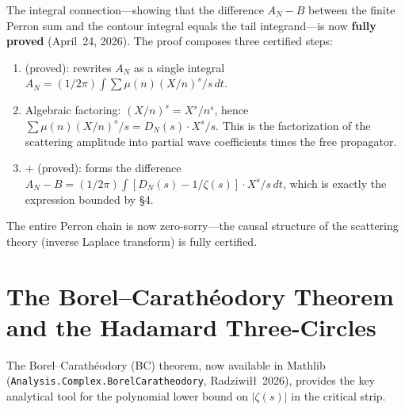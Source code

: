 \documentclass[11pt,a4paper]{article}
\begin{document}
The integral connection---showing that the difference $A_N - B$ between
the finite Perron sum and the contour integral equals the tail integrand---is
now \textbf{fully proved} (April~24, 2026). The proof composes three certified steps:
\begin{enumerate}
  \item {} (proved): rewrites $A_N$ as a
    single integral $A_N = (1/2\pi) \int \sum \mu(n)(X/n)^s/s\,dt$.
  \item Algebraic factoring: $(X/n)^s = X^s/n^s$, hence
    $\sum \mu(n)(X/n)^s/s = D_N(s) \cdot X^s/s$. This is the factorization
    of the scattering amplitude into partial wave coefficients times the
    free propagator.
  \item {} +  (proved): forms
    the difference $A_N - B = (1/2\pi)\int [D_N(s) - 1/\zeta(s)] \cdot X^s/s\,dt$,
    which is exactly the expression bounded by \S4.
\end{enumerate}
The entire Perron chain is now zero-sorry---the causal structure of the
scattering theory (inverse Laplace transform) is fully certified.

\section{The Borel--Carath\'eodory Theorem and the Hadamard Three-Circles}
\label{sec:bc}

The Borel--Carath\'eodory (BC) theorem, now available in Mathlib
(\texttt{Analysis.Complex.BorelCaratheodory}, Radziwi{\l}{\l}\ 2026),
provides the key analytical tool for the polynomial lower bound on
$|\zeta(s)|$ in the critical strip.
\end{document}
